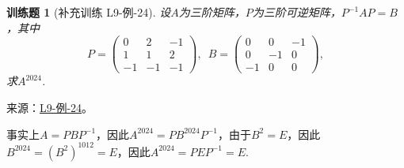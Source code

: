 \documentclass[UTF8,12pt,a4paper,fontset=fandol]{ctexart}
\newtheorem{exercise}{训练题}[section]
\begin{document}
\begin{exercise}[补充训练 L9-例-24]\label{prob:L9-例-24}
设$A$为三阶矩阵，$P$为三阶可逆矩阵，$P^{-1}AP=B$，其中
              \[P=\begin{pmatrix}
                      0 & 2 & -1 \\ 1 & 1 & 2 \\ -1 & -1 & -1
                  \end{pmatrix},\enspace B=\begin{pmatrix}
                      0 & 0 & -1 \\ 0 & -1 & 0 \\ -1 & 0 & 0
                  \end{pmatrix},\]
              求$A^{2024}$.
\end{exercise}
\noindent 来源：\href{https://github.com/yhwu-is/Linear-Algebra-Left-Undone/blob/new/%E8%AE%B2%E4%B9%89/%E4%B8%93%E9%A2%98/9%20%E7%9F%A9%E9%98%B5%E8%BF%90%E7%AE%97%E8%BF%9B%E9%98%B6.tex}{L9-例-24}。
\begin{solve}
事实上$A=PBP^{-1}$，因此$A^{2024}=PB^{2024}P^{-1}$，由于$B^2=E$，因此$B^{2024}=(B^2)^{1012}=E$，因此$A^{2024}=PEP^{-1}=E$.
\end{solve}
\end{document}
